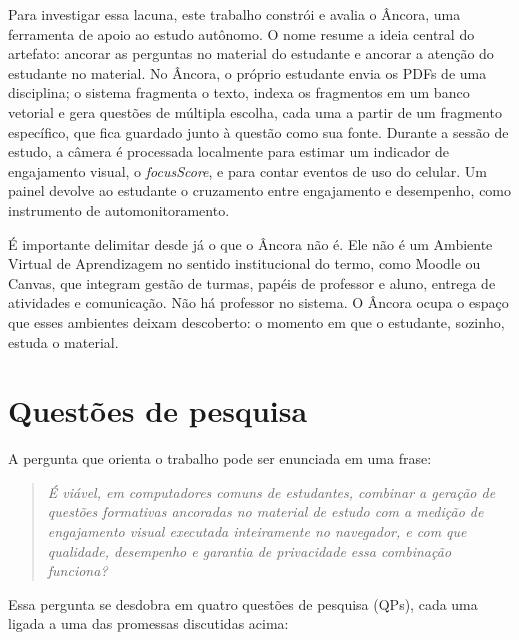 \documentclass[portuguese,oneside]{tcc}
\newcommand{\ferramenta}{Âncora\xspace}
\newcommand{\fs}{\emph{focusScore}\xspace}
\begin{document}
Para investigar essa lacuna, este trabalho constrói e avalia o \ferramenta, uma ferramenta de apoio ao estudo autônomo. O nome resume a ideia central do artefato: ancorar as perguntas no material do estudante e ancorar a atenção do estudante no material. No \ferramenta, o próprio estudante envia os PDFs de uma disciplina; o sistema fragmenta o texto, indexa os fragmentos em um banco vetorial e gera questões de múltipla escolha, cada uma a partir de um fragmento específico, que fica guardado junto à questão como sua fonte. Durante a sessão de estudo, a câmera é processada localmente para estimar um indicador de engajamento visual, o \fs, e para contar eventos de uso do celular. Um painel devolve ao estudante o cruzamento entre engajamento e desempenho, como instrumento de automonitoramento.

É importante delimitar desde já o que o \ferramenta não é. Ele não é um Ambiente Virtual de Aprendizagem no sentido institucional do termo, como Moodle ou Canvas, que integram gestão de turmas, papéis de professor e aluno, entrega de atividades e comunicação. Não há professor no sistema. O \ferramenta ocupa o espaço que esses ambientes deixam descoberto: o momento em que o estudante, sozinho, estuda o material.

\section{Questões de pesquisa}

A pergunta que orienta o trabalho pode ser enunciada em uma frase:

\begin{quote}
\emph{É viável, em computadores comuns de estudantes, combinar a geração de questões formativas ancoradas no material de estudo com a medição de engajamento visual executada inteiramente no navegador, e com que qualidade, desempenho e garantia de privacidade essa combinação funciona?}
\end{quote}

Essa pergunta se desdobra em quatro questões de pesquisa (QPs), cada uma ligada a uma das promessas discutidas acima:
\end{document}

